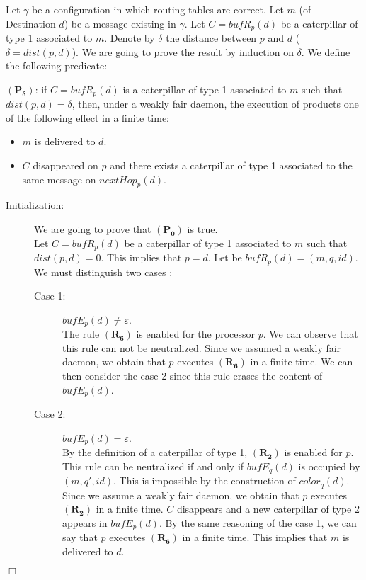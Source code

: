 \documentclass[11pt]{article}
\newenvironment{proof}{{\noindent\bf Proof. } }{{\hfill $\Box$}}
\begin{document}
\begin{proof}
Let $\gamma$ be a configuration in which routing tables are correct. Let $m$ (of Destination $d$) be a message existing in $\gamma$. Let $C=bufR_{p}(d)$ be a caterpillar of type 1 associated to $m$. Denote by $\delta$ the distance between $p$ and $d$ ($\delta=dist(p,d)$). We are going to prove the result by induction on $\delta$. We define the following predicate:

$\boldsymbol{(P_{\delta})}$: if $C=bufR_{p}(d)$ is a caterpillar of type 1 associated to $m$ such that $dist(p,d)=\delta$, then, under a weakly fair daemon, the execution of \AN products one of the following effect in a finite time:

\begin{itemize}
\item $m$ is delivered to $d$. 
\item $C$ disappeared on $p$ and there exists a caterpillar of type 1 associated to the same message on $nextHop_{p}(d)$. 
\end{itemize}

\begin{description}
\item [Initialization:] We are going to prove that $\boldsymbol{(P_{0})}$ is true.\\
Let $C=bufR_{p}(d)$ be a caterpillar of type 1 associated to $m$ such that $dist(p,d)=0$. This implies that $p=d$. Let be $bufR_{p}(d)=(m,q,id)$. We must distinguish two cases :

\begin{description}
\item [Case 1:] $bufE_{p}(d)\neq \varepsilon$.\\
The rule $\boldsymbol{(R_{6})}$ is enabled for the processor $p$. We can observe that this rule can not be neutralized. Since we assumed a weakly fair daemon, we obtain that $p$ executes $\boldsymbol{(R_{6})}$ in a finite time. We can then consider the case 2 since this rule erases the content of $bufE_{p}(d)$.
\item [Case 2:] $bufE_{p}(d)=\varepsilon$.\\
By the definition of a caterpillar of type 1, $\boldsymbol{(R_{2})}$ is enabled for $p$. This rule can be neutralized if and only if $bufE_{q}(d)$ is occupied by $(m,q',id)$. This is impossible by the construction of $color_{q}(d)$. Since we assume a weakly fair daemon, we obtain that $p$ executes $\boldsymbol{(R_{2})}$ in a finite time. $C$ disappears and a new caterpillar of type 2 appears in $bufE_{p}(d)$. By the same reasoning of the case 1, we can say that $p$ executes $\boldsymbol{(R_{6})}$ in a finite time. This implies that $m$ is delivered to $d$.
\end{description}


\end{description}
\end{proof}
\end{document}

